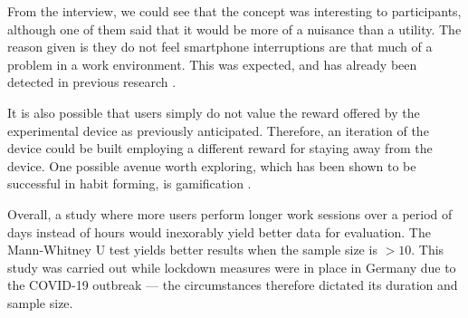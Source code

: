 \documentclass[format=acmsmall]{acmart}
\begin{document}
From the interview, we could see that the concept was interesting to participants, although one of them said that it would be more of a nuisance than a utility. The reason given is they do not feel smartphone interruptions are that much of a problem in a work environment. This was expected, and has already been detected in previous research \cite{oulasvirta_rattenbury_ma_raita_2011}.

It is also possible that users simply do not value the reward offered by the experimental device as previously anticipated. Therefore, an iteration of the device could be built employing a different reward for staying away from the device. One possible avenue worth exploring, which has been shown to be successful in habit forming, is gamification \cite{robson_plangger_kietzmann_mccarthy_pitt_2015}.

Overall, a study where more users perform longer work sessions over a period of days instead of hours would inexorably yield better data for evaluation. The Mann-Whitney U test yields better results when the sample size is $>10$. This study was carried out while lockdown measures were in place in Germany due to the COVID-19 outbreak --- the circumstances therefore dictated its duration and sample size.


\end{document}
